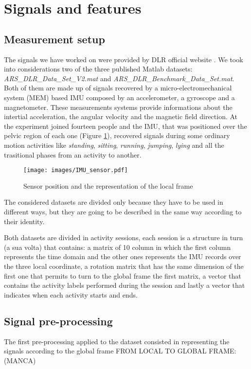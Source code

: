 \documentclass[10pt, conference, letterpaper]{IEEEtran}
\begin{document}
\section{Signals and features}
\subsection{Measurement setup}
The signals we have worked on were provided by DLR official website \cite{DLR}. We took into considerations two of the three published Matlab datasets: \textit{ARS\_DLR\_Data\_Set\_V2.mat} and \textit{ARS\_DLR\_Benchmark\_Data\_Set.mat}. 
Both of them are made up of signals recovered by a micro-electromechanical system (MEM) based IMU composed by an accelerometer, a gyroscope and a magnetometer. These measurements systems provide informations about the intertial acceleration, the angular velocity and the magnetic field direction.
At the experiment joined fourteen people and the IMU, that was positioned over the pelvic region of each one (Figure \ref{fig:IMU}), recovered signals during some ordinary motion activities like \textit{standing}, \textit{sitting}, \textit{running}, \textit{jumping}, \textit{lying} and all the trasitional phases from an activity to another.

\begin{figure}
\texttt{[image: images/IMU\_sensor.pdf]}
\caption{Sensor position and the representation of the local frame}
\label{fig:IMU}
\end{figure}

The considered datasets are divided only because they have to be used in different ways, but they are going to be described in the same way according to their identity.

Both datasets are divided in activity sessions, each session is a structure in turn (a sua volta) that contains: a matrix of 10 column in which the first column represents the time domain and the other ones represents the IMU records over the three local coordinate, a rotation matrix that has the same dimension of the first one that permits to turn to the global frame the first matrix, a vector that contains the activity labels performed during the session and lastly a vector that indicates when each activity starts and ends.


\subsection{Signal pre-processing}
The first pre-processing applied to the dataset consisted in representing the signals according to the global frame
FROM LOCAL TO GLOBAL FRAME: (MANCA)
\end{document}
